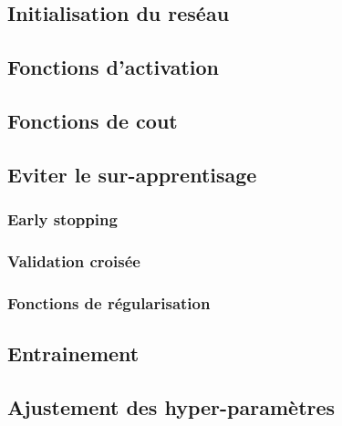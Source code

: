 \documentclass[11pt]{article}
\begin{document}
\subsection{Initialisation du res\'eau}

\subsection{Fonctions d'activation}



\subsection{Fonctions de cout}

\subsection{Eviter le sur-apprentisage}
\subsubsection{Early stopping}
\subsubsection{Validation crois\'ee}
\subsubsection{Fonctions de r\'egularisation}

\subsection{Entrainement}

\subsection{Ajustement des hyper-param\`etres}
\end{document}
